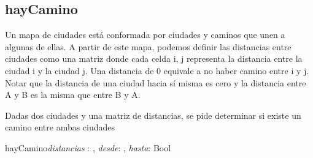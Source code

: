 \documentclass[10pt,a4paper]{article}
\begin{document}
\subsection{hayCamino}

 Un mapa de ciudades está conformada por ciudades y caminos que unen a algunas de ellas. A partir de este mapa, podemos definir las distancias entre ciudades como una matriz donde cada celda i, j representa la distancia entre la ciudad i y la ciudad j. Una distancia de 0 equivale a no haber camino entre i y j. Notar que la distancia de una ciudad hacia sí misma es cero y la distancia entre A y B es la misma que entre B y A.
 
 Dadas dos ciudades y una matriz de distancias, se pide determinar si existe un camino entre ambas ciudades
 
 \vspace{2mm}

 
\begin{proc}{hayCamino}{\In \textit{distancias} : \TLista{\TLista{\ent}}, \In \textit{desde}: \ent, \In \textit{hasta}: \ent}{Bool}
\end{proc}





\vspace{4mm}
\end{document}
